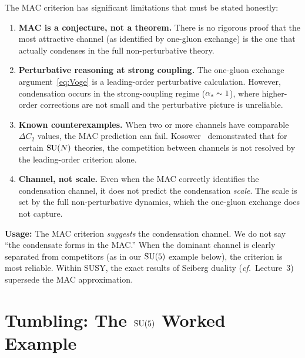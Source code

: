 \documentclass[11pt,a4paper]{article}
\begin{document}
\begin{warningbox}[title={MAC is a heuristic, not a theorem}]
The MAC criterion has significant limitations that must be stated
honestly:
\begin{enumerate}[label=(\alph*)]
  \item \textbf{MAC is a conjecture, not a theorem.}  There is no
    rigorous proof that the most attractive channel (as identified by
    one-gluon exchange) is the one that actually condenses in the
    full non-perturbative theory.

  \item \textbf{Perturbative reasoning at strong coupling.}  The
    one-gluon exchange argument~\eqref{eq:Voge} is a leading-order
    perturbative calculation.  However, condensation occurs in the
    strong-coupling regime ($\alpha_s \sim 1$), where higher-order
    corrections are not small and the perturbative picture is
    unreliable.

  \item \textbf{Known counterexamples.}  When two or more channels
    have comparable $\Delta C_2$ values, the MAC prediction can fail.
    Kosower~\cite{Kosower1983} demonstrated that for certain $\mathrm{SU}(N)$
    theories, the competition between channels is not resolved by the
    leading-order criterion alone.

  \item \textbf{Channel, not scale.}  Even when the MAC correctly
    identifies the condensation channel, it does not predict the
    condensation \emph{scale}.  The scale is set by the full
    non-perturbative dynamics, which the one-gluon exchange does not
    capture.
\end{enumerate}
\textbf{Usage:}  The MAC criterion \emph{suggests} the condensation
channel.  We do not say ``the condensate forms in the MAC.''  When the
dominant channel is clearly separated from competitors (as in our
$\mathrm{SU}(5)$ example below), the criterion is most reliable.  Within SUSY,
the exact results of Seiberg duality (\emph{cf.}\ Lecture~3) supersede
the MAC approximation.
\end{warningbox}


\section{Tumbling: The $\mathrm{SU}(5)$ Worked Example}
\label{sec:tumbling}
\end{document}
